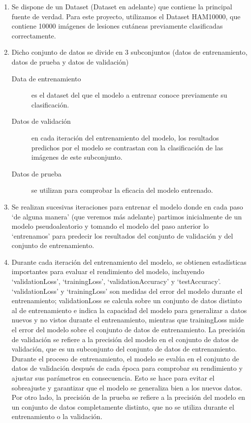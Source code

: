 \begin{enumerate}
			\item Se dispone de un Dataset (Dataset en adelante) que contiene la principal fuente de verdad. 
      Para este proyecto, utilizamos el Dataset HAM10000, que contiene 10000 imágenes de lesiones cutáneas previamente clasificadas correctamente.
			\item Dicho conjunto de datos se divide en 3 subconjuntos (datos de entrenamiento, datos de prueba y datos de validación)
			\begin{description}
			\item [Data de entrenamiento]  es el dataset del que el modelo a entrenar conoce previamente su clasificación. 
			\item [Datos de validaci\'on] en cada iteración del entrenamiento del modelo, los resultados predichos por el modelo se contrastan con la clasificación de las imágenes de este subconjunto.
                \item [Datos de prueba] se utilizan para comprobar la eficacia del modelo entrenado.
		\end{description}
                \item Se realizan sucesivas iteraciones para entrenar el modelo donde en cada paso `de alguna manera' (que veremos más adelante) partimos inicialmente de un modelo pseudoaleatorio y tomando el modelo del paso anterior lo `entrenamos' para predecir los resultados del conjunto de validación y del conjunto de entrenamiento.
                \item Durante cada iteración del entrenamiento del modelo, se obtienen estadísticas importantes para evaluar el rendimiento del modelo, incluyendo `validationLoss', `trainingLoss', `validationAccuracy' y `testAccuracy'. `validationLoss' y `trainingLoss' son medidas del error del modelo durante el entrenamiento; 
                validationLoss se calcula sobre un conjunto de datos distinto al de entrenamiento e indica la capacidad del modelo para generalizar a datos nuevos y no vistos durante el entrenamiento, mientras que trainingLoss mide el error del modelo sobre el conjunto de datos de entrenamiento. 
                La precisión de validación se refiere a la precisión del modelo en el conjunto de datos de validación, que es un subconjunto del conjunto de datos de entrenamiento. 
                Durante el proceso de entrenamiento, el modelo se evalúa en el conjunto de datos de validación después de cada época para comprobar su rendimiento y ajustar sus parámetros en consecuencia. 
                Esto se hace para evitar el sobreajuste y garantizar que el modelo se generaliza bien a los nuevos datos. 
                Por otro lado, la precisión de la prueba se refiere a la precisión del modelo en un conjunto de datos completamente distinto, que no se utiliza durante el entrenamiento o la validación.
                

\end{enumerate}
